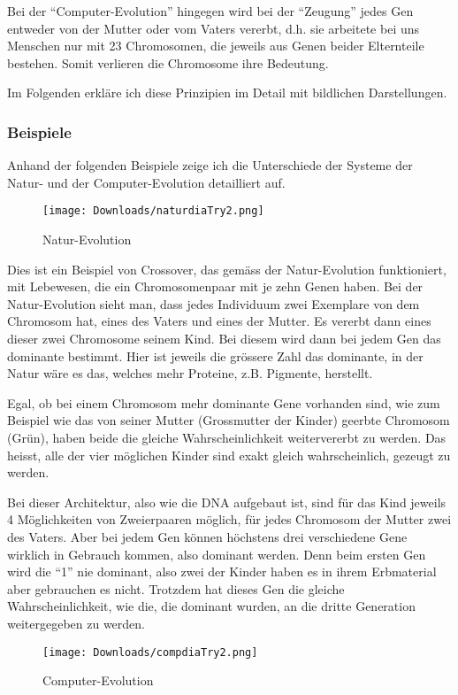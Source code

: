 \documentclass[11pt,a4paper,ngerman]{article}
\begin{document}
\bigskip
Bei der \enquote{Computer-Evolution} hingegen wird bei der \enquote{Zeugung} jedes Gen entweder von der Mutter oder vom Vaters vererbt, d.h. sie arbeitete bei uns Menschen nur mit 23 Chromosomen, die jeweils aus Genen beider Elternteile bestehen. Somit verlieren die Chromosome ihre Bedeutung.

\bigskip
Im Folgenden erkläre ich diese Prinzipien im Detail mit bildlichen Darstellungen.

\pagebreak
\subsubsection{Beispiele}

Anhand der folgenden Beispiele zeige ich die Unterschiede der Systeme der Natur- und der Computer-Evolution detailliert auf.\\
\begin{figure}[H]
    \begin{center}
        \texttt{[image: Downloads/naturdiaTry2.png]}
        \caption{Natur-Evolution} \label{fig:natur}
    \end{center}
\end{figure}

Dies ist ein Beispiel von Crossover, das gemäss der Natur-Evolution funktioniert, mit Lebewesen, die ein Chromosomenpaar mit je zehn Genen haben. Bei der Natur-Evolution sieht man, dass jedes Individuum zwei Exemplare von dem Chromosom hat, eines des Vaters und eines der Mutter. Es vererbt dann eines dieser zwei Chromosome seinem Kind. Bei diesem wird dann bei jedem Gen das dominante bestimmt. Hier ist jeweils die grössere Zahl das dominante, in der Natur wäre es das, welches mehr Proteine, z.B. Pigmente, herstellt.

\bigskip
Egal, ob bei einem Chromosom mehr dominante Gene vorhanden sind, wie zum Beispiel wie das von seiner Mutter (Grossmutter der Kinder) geerbte Chromosom (Grün), haben beide die gleiche Wahrscheinlichkeit weitervererbt zu werden. Das heisst, alle der vier möglichen Kinder sind exakt gleich wahrscheinlich, gezeugt zu werden.

\bigskip
Bei dieser Architektur, also wie die DNA aufgebaut ist, sind für das Kind jeweils 4 Möglichkeiten von Zweierpaaren möglich, für jedes Chromosom der Mutter zwei des Vaters. Aber bei jedem Gen können höchstens drei verschiedene Gene wirklich in Gebrauch kommen, also dominant werden. Denn beim ersten Gen wird die \enquote{1} nie dominant, also zwei der Kinder haben es in ihrem Erbmaterial aber gebrauchen es nicht. Trotzdem hat dieses Gen die gleiche Wahrscheinlichkeit, wie die, die dominant wurden, an die dritte Generation weitergegeben zu werden.\\
\begin{figure}[H]
    \begin{center}
        \texttt{[image: Downloads/compdiaTry2.png]}
        \caption{Computer-Evolution} \label{fig:comp}       
    \end{center}
\end{figure}
\end{document}

